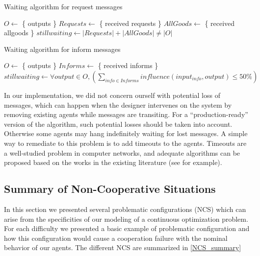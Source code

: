 \begin{algorithm}
\caption{Waiting algorithm for request messages}
\label{algo_waiting_requests}

	$O \leftarrow $ \{ outputs \}\;
	$Requests \leftarrow $ \{ received requests \}\;
	$AllGoods \leftarrow $ \{ received allgoods \}\;
	$stillwaiting \leftarrow |Requests| + |AllGoods| \neq |O|$\;

\end{algorithm}

\begin{algorithm}
\caption{Waiting algorithm for inform messages}
\label{algo_waiting_inform}

	$O \leftarrow $ \{ outputs \}\;
	$Informs \leftarrow $ \{ received informs \}\;
	$stillwaiting \leftarrow \forall output \in O,  (\displaystyle\sum_{info \in Informs}{ influence(input_{info}, output) \leq 50\%})$\;

\end{algorithm}

In our implementation, we did not concern ourself with potential loss of messages, which can happen when the designer intervenes on the system by removing existing agents while messages are transiting. For a \enquote{production-ready} version of the algorithm, such potential losses should be taken into account. Otherwise some agents may hang indefinitely waiting for  lost messages. A simple way to remediate to this problem is to add timeouts to the agents. Timeouts are a well-studied problem in computer networks, and adequate algorithms can be proposed based on the works in the existing literature (see \cite{jacobson1988congestion} for example).

\subsection{Summary of Non-Cooperative Situations}

In this section we presented several problematic configurations (NCS) which can arise from the specificities of our modeling of a continuous optimization problem. For each difficulty we presented a basic example of problematic configuration and how this configuration would cause a cooperation failure with the nominal behavior of our agents. The different NCS are summarized in \tablename{} \ref{NCS_summary}

